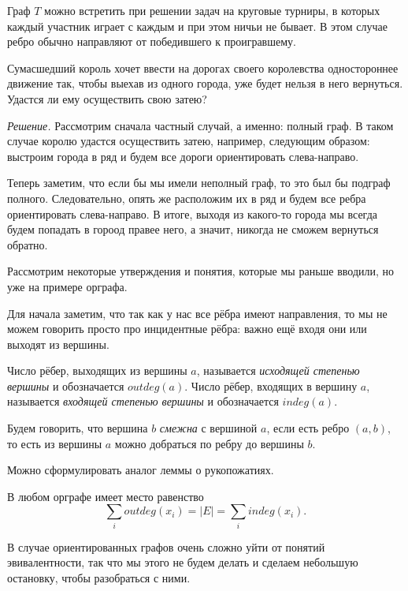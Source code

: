 	Граф $T$ можно встретить при решении задач на круговые турниры, в которых каждый участник играет с каждым и при этом ничьи не бывает. В этом случае ребро обычно направляют от победившего к проигравшему.
\begin{example}
	Сумасшедший король хочет ввести на дорогах своего королевства одностороннее движение так, чтобы выехав из одного города, уже будет нельзя в него вернуться. Удастся ли ему осуществить свою затею?
	
	\emph{Решение.} Рассмотрим сначала частный случай, а именно: полный граф. В таком случае королю удастся осуществить затею, например, следующим образом: выстроим города в ряд и будем все дороги ориентировать слева-направо.
	
	Теперь заметим, что если бы мы имели неполный граф, то это был бы подграф полного. Следовательно, опять же расположим их в ряд и будем все ребра ориентировать слева-направо. В итоге, выходя из какого-то города мы всегда будем попадать в гороод правее него, а значит, никогда не сможем вернуться обратно.
\end{example}

	Рассмотрим некоторые утверждения и понятия, которые мы раньше вводили, но уже на примере орграфа.
	
	Для начала заметим, что так как у нас все рёбра имеют направления, то мы не можем говорить просто про инцидентные рёбра: важно ещё входя они или выходят из вершины.
	
\begin{definition}
	Число рёбер, выходящих из вершины $a$, называется \emph{исходящей степенью вершины} и обозначается $outdeg (a)$. Число рёбер, входящих в вершину $a$, называется \emph{входящей степенью вершины} и обозначается $indeg (a)$.
\end{definition}

\begin{definition}
	Будем говорить, что вершина $b$ \emph{смежна} с вершиной $a$, если есть ребро $(a, b)$, то есть из вершины $a$ можно добраться по ребру до вершины $b$.
\end{definition}

	Можно сформулировать аналог леммы о рукопожатиях.
	
\begin{lemma}[о взятках]
	В любом орграфе имеет место равенство
	$$\sum_i outdeg (x_i) = |E| = \sum_i indeg (x_i).$$
\end{lemma}

	В случае ориентированных графов очень сложно уйти от понятий эвивалентности, так что мы этого не будем делать и сделаем небольшую остановку, чтобы разобраться с ними. 
	
